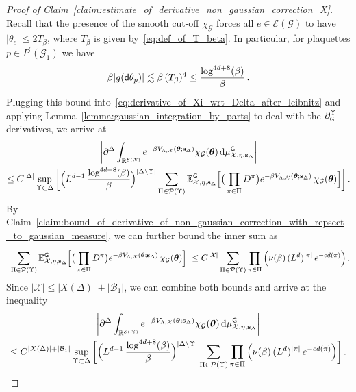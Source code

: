 \documentclass[11pt]{article}
\theoremstyle{definition}
\theoremstyle{remark}
\numberwithin{theorem}{section}
\def\La{{\Lambda}}
\newcommand{\bR}{\mathbb R}
\newcommand{\bE}{\mathbb E}
\newcommand{\cE}{\mathcal{E}}
\begin{document}
    \begin{proof}[Proof of Claim~\ref{claim:estimate_of_derivative_non_gaussian_correction_X}]
        Recall that the presence of the smooth cut-off $\chi_\mathcal{G}$ forces all $e\in \cE(\mathcal{G})$ to have $|\theta_e| \le 2 T_\beta$, where $T_\beta$ is given by~\eqref{eq:def_of_T_beta}. In particular, for plaquettes $p\in P^\prime(\mathcal{G}_1)$ we have 
        \[
        \beta |g({\sf d}\theta_p)| \lesssim \beta \,  (T_\beta)^4 \le \frac{\log^{4d+8}(\beta)}{\beta} \, .
        \]
        Plugging this bound into~\eqref{eq:derivative_of_Xi_wrt_Delta_after_leibnitz} and applying Lemma~\ref{lemma:gaussian_integration_by_parts} to deal with the $\partial_{\sf G}^{\Upsilon}$ derivatives, we arrive at 
        \begin{multline*}
            \bigg|\partial^\Delta \int_{\bR^{\cE(\mathcal{X})}} e^{-\beta V_{\Lambda,\mathcal{X}}(\boldsymbol{\theta};\mathbf{s}_\Delta)} \chi_{\mathcal{G}}(\boldsymbol{\theta}) \, {\rm d}\mu_{\mathcal{X},\eta,\mathbf{s}_\Delta}^{\sf G} \bigg| \\ \le C^{|\Delta|} \sup_{\Upsilon\subset \Delta} \bigg[ \Big(L^{d-1} \, \frac{\log^{4d+8}(\beta)}{\beta}\Big)^{|\Delta \setminus \Upsilon|} \sum_{\Pi\in \mathcal{P}(\Upsilon)} \bE_{\mathcal{X},\eta,\mathbf{s}_{\Delta}}^{\sf G} \Big[ \big( \prod_{\pi\in \Pi} D^\pi\big) e^{-\beta V_{\La,\mathcal{X}} (\boldsymbol{\theta}; \mathbf{s}_{\Delta})} \, \chi_{\mathcal{G}} (\boldsymbol{\theta})  \Big] \bigg] \, .
        \end{multline*}
        By Claim~\ref{claim:bound_of_derivative_of_non_gaussian_correction_with_repsect_to_gaussian_measure}, we can further bound the inner sum as
        \[
        \bigg|\sum_{\Pi\in \mathcal{P}(\Upsilon)} \bE_{\mathcal{X},\eta,\mathbf{s}_{\Delta}}^{\sf G} \Big[ \big( \prod_{\pi\in \Pi} D^\pi\big) e^{-\beta V_{\La,\mathcal{X}} (\boldsymbol{\theta}; \mathbf{s}_{\Delta})} \, \chi_{\mathcal{G}} (\boldsymbol{\theta})  \Big] \bigg| \le  C^{|\mathcal{X}|} \sum_{\Pi\in \mathcal{P}(\Upsilon)} \prod_{\pi\in \Pi} \Big(\nu(\beta) \, (L^d)^{|\pi|} \, e^{-c d(\pi)}\Big) \, .
        \]
        Since $|\mathcal{X}| \le |X(\Delta)| + |\mathcal{B}_1|$, we can combine both bounds and arrive at the inequality 
        \begin{multline} \label{eq:proof_of_claim:estimate_of_derivative_non_gaussian_correction_X_after_taking_derivatives}
             \bigg|\partial^\Delta \int_{\bR^{\cE(\mathcal{X})}} e^{-\beta V_{\Lambda,\mathcal{X}}(\boldsymbol{\theta};\mathbf{s}_\Delta)} \chi_{\mathcal{G}}(\boldsymbol{\theta}) \, {\rm d}\mu_{\mathcal{X},\eta,\mathbf{s}_\Delta}^{\sf G} \bigg| \\ \le C^{|X(\Delta)| + |\mathcal{B}_1|}  \sup_{\Upsilon\subset \Delta} \bigg[ \Big(L^{d-1} \, \frac{\log^{4d+8}(\beta)}{\beta}\Big)^{|\Delta \setminus \Upsilon|} \sum_{\Pi\in \mathcal{P}(\Upsilon)} \prod_{\pi\in \Pi} \Big(\nu(\beta) \, (L^d)^{|\pi|} \,  e^{-c d(\pi)}\Big) \bigg] \, .

\end{multline}
\end{proof}
\end{document}
